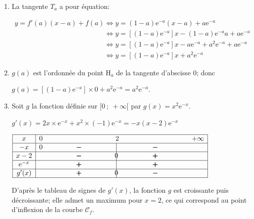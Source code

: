 \documentclass[10pt]{article}
\providecommand{\e}{{\mathrm{e}}}
\begin{document}
\begin{enumerate}
	\begin{enumerate}
		\item 
La tangente $T_a$ a pour équation:

$\begin{gathered}y=f'(a)(x-a)+f(a)
\iff
y= (1-a)\e^{-a}(x-a)+a\e^{-a}\\
\phantom{y=f'(a)(x-a)+f(a)}
\iff
y= \left [(1-a)\e^{-a}\right ]x- (1-a)\e^{-a}a+a\e^{-a}\\
\phantom{y=f'(a)(x-a)+f(a)}
\iff
y= \left [(1-a)\e^{-a}\right ]x -a\e^{-a}+a^2\e^{-a}+a\e^{-a}\\
\phantom{y=f'(a)(x-a)+f(a)}
\iff
y= \left [(1-a)\e^{-a}\right ]x +a^2\e^{-a}\end{gathered}$
		
		\item 
$g(a)$ est l'ordonnée	du point H$_a$ de la tangente d'abscisse 0;
donc 

$g(a)= \left [(1-a)\e^{-a}\right ]\times 0 +a^2\e^{-a}=a^2\e^{-a}$.
		
		\item 
Soit $g$ la fonction définie sur $[0~;~ +\infty[$ par $g(x)=x^2\e^{-x}$.

$g'(x)=2x\times \e^{-x}+ x^2\times (-1)\e^{-x}= -x(x-2)\e^{-x}$

\begin{center}
{\renewcommand{\arraystretch}{1.5}
\def\esp{\hspace*{3cm}}
$\begin{array}{|c | *{5}{c} |} 
\hline
x  & 0 & \esp & 2 & \esp  & +\infty \\
\hline
-x &  0 & \pmb{-} &  \vline\hspace{-2.7pt}{\phantom 0} & \pmb{-} &   \\
\hline
x-2 &  & \pmb{-} &  \vline\hspace{-2.7pt}{0} & \pmb{+} &   \\
\hline
\e^{-x} &  & \pmb{+} &  \vline\hspace{-2.7pt}{\phantom 0} & \pmb{+} &   \\
\hline
g'(x) &  & \pmb{+} &  \vline\hspace{-2.7pt}{0} & \pmb{-} &   \\
\hline
\end{array}$
}
\end{center}

D'après le tableau de signes de $g'(x)$, la fonction $g$ est croissante puis décroissante; elle admet un maximum pour $x=2$, ce qui correspond au point d'inflexion de la courbe $\mathcal{C}_f$.


	\end{enumerate}
\end{enumerate}

\bigskip
\end{document}
